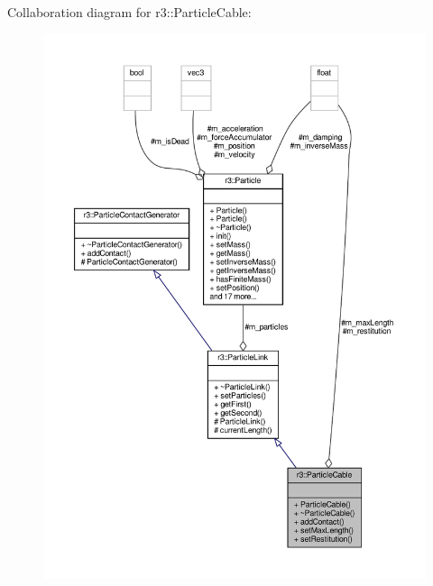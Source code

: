 Collaboration diagram for r3\+:\+:Particle\+Cable\+:\nopagebreak
\begin{figure}[H]
\begin{center}
\leavevmode
\includegraphics[width=350pt]{classr3_1_1_particle_cable__coll__graph}
\end{center}
\end{figure}

